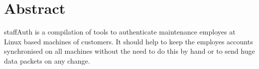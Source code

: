 %
%
%
%
%
%
%


\section*{Abstract}

staffAuth is a compilation of tools to authenticate maintenance employes at
Linux based machines of customers. It should help to keep the employes accounts
synchronised on all machines without the need to do this by hand or to send huge
data packets on any change.
